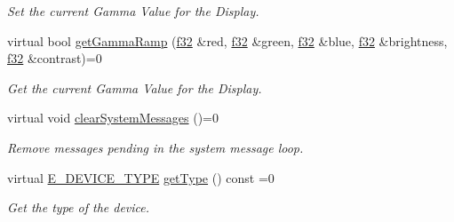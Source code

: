 \begin{DoxyCompactItemize}
\begin{DoxyCompactList}\small\item\em Set the current Gamma Value for the Display. \end{DoxyCompactList}\item 
\mbox{\label{classirr_1_1IrrlichtDevice_a30c4e1716271600a88e0ca07ca030f9b}} 
virtual bool \hyperlink{classirr_1_1IrrlichtDevice_a30c4e1716271600a88e0ca07ca030f9b}{get\+Gamma\+Ramp} (\hyperlink{namespaceirr_a0277be98d67dc26ff93b1a6a1d086b07}{f32} \&red, \hyperlink{namespaceirr_a0277be98d67dc26ff93b1a6a1d086b07}{f32} \&green, \hyperlink{namespaceirr_a0277be98d67dc26ff93b1a6a1d086b07}{f32} \&blue, \hyperlink{namespaceirr_a0277be98d67dc26ff93b1a6a1d086b07}{f32} \&brightness, \hyperlink{namespaceirr_a0277be98d67dc26ff93b1a6a1d086b07}{f32} \&contrast)=0
\begin{DoxyCompactList}\small\item\em Get the current Gamma Value for the Display. \end{DoxyCompactList}\item 
virtual void \hyperlink{classirr_1_1IrrlichtDevice_aa10c6151a267d8a1500d5dc7b44425dd}{clear\+System\+Messages} ()=0
\begin{DoxyCompactList}\small\item\em Remove messages pending in the system message loop. \end{DoxyCompactList}\item 
virtual \hyperlink{namespaceirr_ac25d94cf2e1037c7ca18ee79b3bd4505}{E\+\_\+\+D\+E\+V\+I\+C\+E\+\_\+\+T\+Y\+PE} \hyperlink{classirr_1_1IrrlichtDevice_a2a2ec439b1f153169003c4d3e986a7d7}{get\+Type} () const =0
\begin{DoxyCompactList}\small\item\em Get the type of the device. \end{DoxyCompactList}\end{DoxyCompactItemize}
